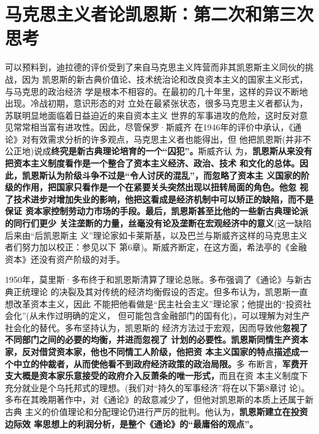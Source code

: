 \section{马克思主义者论凯恩斯：第二次和第三次思考}
可以预料到，迪拉德的评价受到了来自马克思主义阵营而非其凯恩斯主义同伙的挑战，因为
凯恩斯的新古典价值论、技术统治论和改良资本主义的国家主义形式，与马克思的政治经济
学是根本不相容的。在最初的几十年里，这样的异议不断地出现。冷战初期，意识形态的对
立处在最紧张状态，很多马克思主义者都认为，苏联明显地面临着日益迫近的来自资本主义
世界的军事进攻的危险，这时反对意见常常相当富有进攻性。因此，尽管保罗·斯威齐
在1946年的评价中承认，《通论》对有效需求分析的许多观点，马克思主义者也能得出，但
他把凯恩斯(并非不公正地)说成\textbf{终究是新古典理论培育的一个“囚犯”。}斯威齐认
为，\textbf{凯恩斯从来没有把资本主义制度看作是一个整合了资本主义经济、政治、技术
  和文化的总体。因此，凯恩斯认为阶级斗争不过是“令人讨厌的混乱”，而忽略了资本主
  义国家的阶级的作用，把国家只看作是一个在紧要关头突然出现以扭转局面的角色。他忽
  视了技术进步对增加失业的影响，他把这看成是经济机制中可以矫正的缺陷，而不是保证
  资本家控制劳动力市场的手段。最后，凯恩斯甚至比他的一些新古典理论派的同行们更少
  关注垄断的力量，丝毫没有论及垄断在宏观经济中的意义}(这一缺陷后来由“后凯恩斯主
义”理论家如卡莱斯基，以及巴兰与斯威齐这样的马克思主义者们努力加以校正：参见以下
第6章)。斯威齐断定，在这方面，希法亭的《金融资本》还没有资产阶级的对手。

1950年，莫里斯·多布终于和凯恩斯清算了理论总账。多布强调了《通论》与新古典正统理论
的决裂及其对传统的经济均衡假设的否定。但多布认为，凯恩斯一直想改革资本主义，因此
不能把他看做是“民主社会主义”理论家；他提出的“投资社会化”(从未作过明确的定义，
但可能包含金融部门的国有化)，可以理解为对生产社会化的替代。多布坚持认为，凯恩斯的
经济方法过于宏观，因而导致他\textbf{忽视了不同部门之间的必要的均衡，并进而忽视了
  计划的必要性。凯恩斯同情生产资本家，反对借贷资本家，他也不同情工人阶级，他把资
  本主义国家的特点描述成一个中立的仲裁者，从而使他看不到政府经济政策的政治局限。}多
布断言，\textbf{军费开支大概是资本家乐意接受的政府介入反萧条的唯一形式，}而且在资
本主义制度下充分就业是个乌托邦式的理想。(我们对“持久的军事经济”将在以下第8章讨
论)。多布在其晚期著作中，对《通论》的敌意减少了，但他对凯恩斯的本质上还属于新古典
主义的价值理论和分配理论仍进行严厉的批判。他认为，\textbf{凯恩斯建立在投资边际效
  率思想上的利润分析，是整个《通论》的“最庸俗的观点”。}

